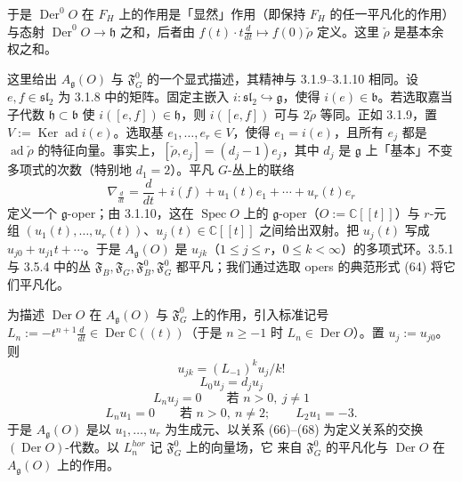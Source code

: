 于是 $\operatorname{Der}^{0}O$ 在 $F_{H}$ 上的作用是「显然」作用（即保持 $F_{H}$ 的任一平凡化的作用）与态射 $\operatorname{Der}^{0}O\to\mathfrak{h}$ 之和，后者由 $f(t)\cdot t\frac{d}{dt}\mapsto f(0)\check\rho$ 定义。这里 $\check\rho$ 是基本余权之和。

 这里给出 $A_{\mathfrak{g}}(O)$ 与 $\mathfrak{F}^{0}_{G}$ 的一个显式描述，其精神与 3.1.9–3.1.10 相同。设 $e,f\in\mathfrak{sl}_{2}$ 为 3.1.8 中的矩阵。固定主嵌入 $i:\mathfrak{sl}_{2}\hookrightarrow\mathfrak{g}$，使得 $i(e)\in\mathfrak{b}$。若选取嘉当子代数 $\mathfrak{h}\subset\mathfrak{b}$ 使 $i([e,f])\in\mathfrak{h}$，则 $i([e,f])$ 可与 $2\check\rho$ 等同。正如 3.1.9，置 $V:=\operatorname{Ker}\operatorname{ad}i(e)$。选取基 $e_{1},\dots,e_{r}\in V$，使得 $e_{1}=i(e)$，且所有 $e_{j}$ 都是 $\operatorname{ad}\check\rho$ 的特征向量。事实上，$[\check\rho,e_{j}]=(d_{j}-1)e_{j}$，其中 $d_{j}$ 是 $\mathfrak{g}$ 上「基本」不变多项式的次数（特别地 $d_{1}=2$）。平凡 $G$-丛上的联络
\begin{equation}\tag{64}
\nabla_{\frac{d}{dt}}=\frac{d}{dt}+i(f)+u_{1}(t)e_{1}+\cdots+u_{r}(t)e_{r}
\end{equation}
定义一个 $\mathfrak{g}$-oper；由 3.1.10，这在 $\operatorname{Spec}O$ 上的 $\mathfrak{g}$-oper（$O:=\mathbb{C}[[t]]$）与 $r$-元组 $(u_{1}(t),\dots,u_{r}(t))$、$u_{j}(t)\in\mathbb{C}[[t]]$ 之间给出双射。把 $u_{j}(t)$ 写成 $u_{j0}+u_{j1}t+\cdots$。于是 $A_{\mathfrak{g}}(O)$ 是 $u_{jk}$（$1\le j\le r$，$0\le k<\infty$）的多项式环。3.5.1 与 3.5.4 中的丛 $\mathfrak{F}_{B},\mathfrak{F}_{G},\mathfrak{F}^{0}_{B},\mathfrak{F}^{0}_{G}$ 都平凡；我们通过选取 opers 的典范形式 (64) 将它们平凡化。

为描述 $\operatorname{Der}O$ 在 $A_{\mathfrak{g}}(O)$ 与 $\mathfrak{F}^{0}_{G}$ 上的作用，引入标准记号 $L_{n}:=-t^{n+1}\frac{d}{dt}\in\operatorname{Der}\mathbb{C}((t))$（于是 $n\ge-1$ 时 $L_{n}\in\operatorname{Der}O$）。置 $u_{j}:=u_{j0}$。则
\begin{equation}\tag{65}
u_{jk}=(L_{-1})^{k}u_{j}/k!
\end{equation}
\begin{equation}\tag{66}
L_{0}u_{j}=d_{j}u_{j}
\end{equation}
\begin{equation}\tag{67}
L_{n}u_{j}=0\qquad\text{若 }n>0,\ j\ne1
\end{equation}
\begin{equation}\tag{68}
L_{n}u_{1}=0\qquad\text{若 }n>0,\ n\ne2;\qquad L_{2}u_{1}=-3.
\end{equation}
于是 $A_{\mathfrak{g}}(O)$ 是以 $u_{1},\dots,u_{r}$ 为生成元、以关系 (66)–(68) 为定义关系的交换 $(\operatorname{Der}O)$-代数。以 $L_{n}^{hor}$ 记 $\mathfrak{F}^{0}_{G}$ 上的向量场，它%
来自 $\mathfrak{F}^{0}_{G}$ 的平凡化与 $\operatorname{Der}O$ 在 $A_{\mathfrak{g}}(O)$ 上的作用。

